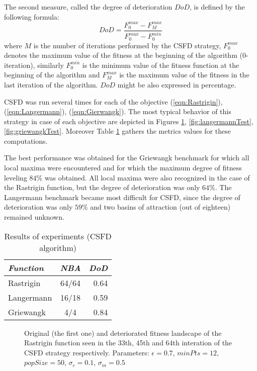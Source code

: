 The second measure, called the degree of deterioration $DoD$, is
defined by the following formula:
\begin{equation}
\label{eq:dod}
DoD = \frac{F_0^{max} - F_M^{max}}{F_0^{max} - F_0^{min}}
\end{equation}
where $M$ is the number of iterations performed by the CSFD strategy, 
$F_0^{max}$ denotes the maximum value of the fitness at the beginning of the 
algorithm ($0$-iteration), similarly $F_0^{min}$ is the minimum value of the
fitness function at the beginning of the algorithm and $F_M^{max}$ is the 
maximum value of the fitness in the last iteration of the algorithm.
$DoD$ might be also expressed in percentage.

CSFD was run several times for each of the objective 
(\ref{eqn:Rastrigin}), (\ref{eqn:Langermann}), (\ref{eqn:Gierwangk}).
The most typical behavior of this strategy in case of each objective
are depicted in Figures 
\ref{fig:rastriginTest}, \ref{fig:langermannTest}, \ref{fig:griewangkTest}.
Moreover Table \ref{tab:resultsCsfd} gathers the metrics values for these
computations.

The best performance was obtained for the Griewangk benchmark for which
all local maxima were encountered and for which the maximum degree 
of fitness leveling $84\%$ was obtained.
All local maxima were also recognized in the case of the Rastrigin function,
but the degree of deterioration was only $64\%$. The Langermann benchmark
became most difficult for CSFD, since the degree of deterioration was only
$59\%$ and two basins of attraction (out of eighteen) remained unknown. 

\begin{table}
\begin{center}
\caption{Results of experiments (CSFD algorithm)}
\begin{tabular}{| l | c | r |}
\hline
\label{tab:resultsCsfd}
\textit{Function} & \textit{NBA} & \textit{DoD} \\ \hline \hline
Rastrigin & 64/64 & 0.64 \\ \hline
Langermann & 16/18 & 0.59 \\ \hline
Griewangk & 4/4 & 0.84 \\ \hline
\end{tabular}
\end{center}
\end{table}


\begin{figure}
  \centering
  \caption{Original (the first one) and deteriorated fitness landscape 
  of the Rastrigin function seen in the 33th, 45th and 64th interation 
  of the CSFD strategy respectively. 
  Parameters: $\epsilon=0.7$, $minPts=12$, $popSize=50$,
  $\sigma_c=0.1$, $\sigma_m=0.5$}
  \label{fig:rastriginTest}
\end{figure}


